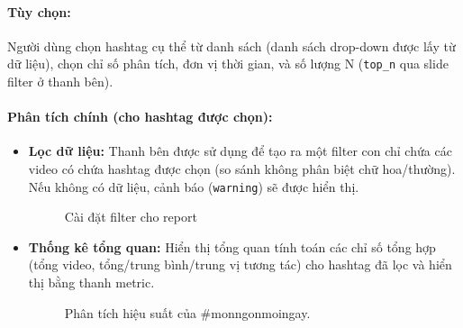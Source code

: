 \paragraph{Tùy chọn:} Người dùng chọn hashtag cụ thể từ danh sách (danh sách drop-down được lấy từ dữ liệu), chọn chỉ số phân tích, đơn vị thời gian, và số lượng N (\texttt{top\_n} qua slide filter ở thanh bên).

\paragraph{Phân tích chính (cho hashtag được chọn):}
    \begin{itemize}
        \item \textbf{Lọc dữ liệu:} Thanh bên được sử dụng để tạo ra một filter con chỉ chứa các video có chứa hashtag được chọn (so sánh không phân biệt chữ hoa/thường). Nếu không có dữ liệu, cảnh báo (\texttt{warning}) sẽ được hiển thị.
        \begin{figure}[H]
            \centering
            \caption{Cài đặt filter cho report}
        \end{figure}

        \item \textbf{Thống kê tổng quan:} Hiển thị tổng quan tính toán các chỉ số tổng hợp (tổng video, tổng/trung bình/trung vị tương tác) cho hashtag đã lọc và hiển thị bằng thanh metric.
        \begin{figure}[H]
            \centering
            \caption{Phân tích hiệu suất của \#monngonmoingay.}
        \end{figure}
        

\end{itemize}
